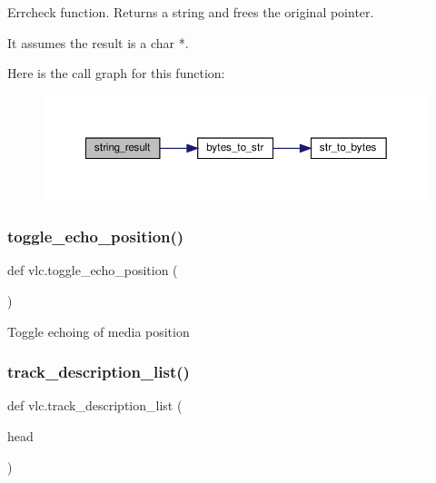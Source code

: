 \begin{DoxyVerb}Errcheck function. Returns a string and frees the original pointer.

It assumes the result is a char *.
\end{DoxyVerb}
 Here is the call graph for this function\+:
\nopagebreak
\begin{figure}[H]
\begin{center}
\leavevmode
\includegraphics[width=350pt]{namespacevlc_a6b173f59be4b100a9fef397e47cbdda1_cgraph}
\end{center}
\end{figure}
\mbox{\label{namespacevlc_abe636627cfa8857acea999214e26263b}} 
\subsubsection{\texorpdfstring{toggle\+\_\+echo\+\_\+position()}{toggle\_echo\_position()}}
{\footnotesize\ttfamily def vlc.\+toggle\+\_\+echo\+\_\+position (\begin{DoxyParamCaption}{ }\end{DoxyParamCaption})}

\begin{DoxyVerb}Toggle echoing of media position\end{DoxyVerb}
 \mbox{\label{namespacevlc_a7641c1329f78164fb94c4a89738ff38a}} 
\subsubsection{\texorpdfstring{track\+\_\+description\+\_\+list()}{track\_description\_list()}}
{\footnotesize\ttfamily def vlc.\+track\+\_\+description\+\_\+list (\begin{DoxyParamCaption}\item[{}]{head }\end{DoxyParamCaption})}

